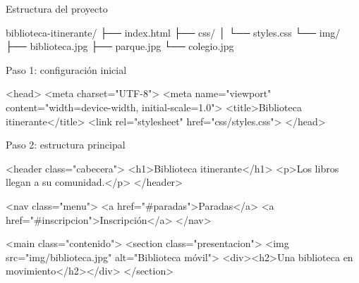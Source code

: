 \documentclass[aspectratio=169,11pt]{beamer}
\begin{document}
    \begin{frame}[fragile]{Estructura del proyecto}
        \begin{bashcodedark}
            biblioteca-itinerante/
            ├── index.html
            ├── css/
            │   └── styles.css
            └── img/
            ├── biblioteca.jpg
            ├── parque.jpg
            └── colegio.jpg
        \end{bashcodedark}

    \end{frame}

    \begin{frame}[fragile]{Paso 1: configuración inicial}
        \begin{htmlcodedark}
        <head>
            <meta charset="UTF-8">
            <meta name="viewport"
                content="width=device-width, initial-scale=1.0">
            <title>Biblioteca itinerante</title>
            <link rel="stylesheet" href="css/styles.css">
        </head>
        \end{htmlcodedark}

    \end{frame}

    \begin{frame}[fragile]{Paso 2: estructura principal}
        \begin{htmlcodedark}
        <header class="cabecera">
            <h1>Biblioteca itinerante</h1>
            <p>Los libros llegan a su comunidad.</p>
        </header>

        <nav class="menu">
            <a href="#paradas">Paradas</a>
            <a href="#inscripcion">Inscripción</a>
        </nav>

        <main class="contenido">
            <section class="presentacion">
                <img src="img/biblioteca.jpg" alt="Biblioteca móvil">
                <div><h2>Una biblioteca en movimiento</h2></div>
            </section>
        \end{htmlcodedark}
    \end{frame}
\end{document}
